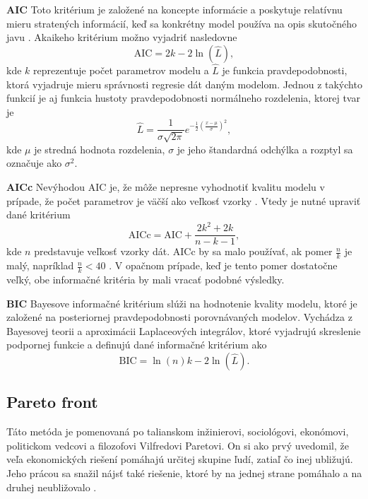 \textbf{AIC}
\newline
Toto kritérium je založené na koncepte informácie a poskytuje relatívnu mieru stratených informácií, keď sa konkrétny model používa na opis skutočného javu \cite{emiliano:stand_crit:2014}. Akaikeho kritérium možno vyjadriť nasledovne
\begin{equation}
	\text{AIC} = 2k - 2\ln\left( \hat{L} \right),
\end{equation}
kde $ k $ reprezentuje počet parametrov modelu a $ \hat{L} $ je funkcia pravdepodobnosti, ktorá vyjadruje mieru správnosti regresie dát daným modelom. Jednou z takýchto funkcií je aj funkcia hustoty pravdepodobnosti normálneho rozdelenia, ktorej tvar je 
\begin{equation}
	\hat{L} = \frac{1}{\sigma \sqrt{2\pi}}e^{-\frac{1}{2}\left( \frac{x - \mu}{\sigma} \right)^2},
\end{equation}
kde $ \mu $ je stredná hodnota rozdelenia, $ \sigma $ je jeho štandardná odchýlka a rozptyl sa označuje ako $ \sigma^2 $.

\textbf{AICc}
\newline
Nevýhodou AIC je, že môže nepresne vyhodnotiť kvalitu modelu v prípade, že počet parametrov je väčší ako veľkosť vzorky \cite{emiliano:stand_crit:2014}. Vtedy je nutné upraviť dané kritérium
\begin{equation}
	\text{AICc} = \text{AIC} + \frac{2k^2 + 2k}{n - k - 1}, 
\end{equation}
kde $ n $ predstavuje veľkosť vzorky dát. AICc by sa malo používať, ak pomer $ \frac{n}{k} $ je malý, napríklad $ \frac{n}{k} < 40$ \cite{kenneth:understanding_stand_crit:2004}. V opačnom prípade, keď je tento pomer dostatočne veľký, obe informačné kritéria by mali vracať podobné výsledky.

\textbf{BIC}
\newline
Bayesove informačné kritérium slúži na hodnotenie kvality modelu, ktoré je založené na posteriornej pravdepodobnosti porovnávaných modelov. Vychádza z Bayesovej teorii a aproximácii Laplaceových integrálov, ktoré vyjadrujú skreslenie podpornej funkcie \cite{emiliano:stand_crit:2014} a definujú dané informačné kritérium ako
\begin{equation}
	\text{BIC} = \ln\left( n \right)k - 2\ln\left( \hat{L} \right).
\end{equation}

\subsection{Pareto front}
Táto metóda je pomenovaná po talianskom inžinierovi, sociológovi, ekonómovi, politickom vedcovi a filozofovi Vilfredovi Paretovi. On si ako prvý uvedomil, že veľa ekonomických riešení pomáhajú určitej skupine ľudí, zatiaľ čo inej ubližujú. Jeho prácou sa snažil nájsť také riešenie, ktoré  by na jednej strane pomáhalo a na druhej neubližovalo \cite{mornati:pareto_opt:2013}. 


